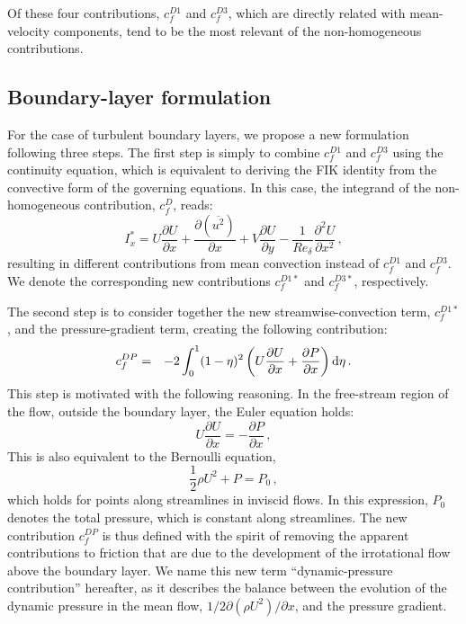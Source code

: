 Of these four contributions, $c^{D1}_f$ and $c^{D3}_f$, which are directly related with mean-velocity components, tend to be the most relevant of the non-homogeneous contributions.

\subsection{Boundary-layer formulation}
For the case of turbulent boundary layers, we propose a new formulation following three steps. The first step is simply to combine $c^{D1}_f$ and $c^{D3}_f$ using the continuity equation, which is equivalent to deriving the FIK identity from the convective form of the governing equations. In this case, the integrand of the non-homogeneous contribution, $c^D_f$, reads: 
\begin{equation}
    I^*_x = U\frac{\partial U}{\partial x} + \frac{\partial (\overline{u^2})}{\partial x} + V \frac{\partial U}{\partial y} - \frac{1}{Re_{\delta}} \frac{\partial^2 U}{\partial x^2}\,,
\end{equation}
resulting in different contributions from mean convection instead of $c^{D1}_f$ and $c^{D3}_f$. We denote the corresponding new contributions $c^{D1*}_f$ and $c^{D3*}_f$, respectively.


The second step is to consider together the new streamwise-convection term, $c^{D1*}_f$, and the pressure-gradient term, creating the following contribution:
\begin{eqnarray}
    c^{DP}_f &=& -2 \int_0^1 (1-\eta)^2 \left ( U \frac{\partial U}{\partial x} + \frac{\partial P}{\partial x} \right ) {\rm d} \eta\,.
\end{eqnarray}
This step is motivated with the following reasoning. In the free-stream region of the flow, outside the boundary layer, the Euler equation holds:
\begin{equation}
    U \frac{\partial U}{\partial x} = - \frac{\partial P}{\partial x}\,,
    \label{eq:Euler}
\end{equation}
This is also equivalent to the Bernoulli equation, 
\begin{equation}
    \frac 12 \rho U^2 +P = P_0\,,
    \label{eq:Bernoulli}
\end{equation}
which holds for points along streamlines in inviscid flows. In this expression, $P_0$ denotes the total pressure, which is constant along streamlines. The new contribution $c^{DP}_f$ is thus defined with the spirit of removing the apparent contributions to friction that are due to the development of the irrotational flow above the boundary layer. We name this new term ``dynamic-pressure contribution'' hereafter, as it describes the balance between the evolution of the dynamic pressure in the mean flow, $ 1/2 \partial(\rho U^2) / \partial x$, and the pressure gradient. 

